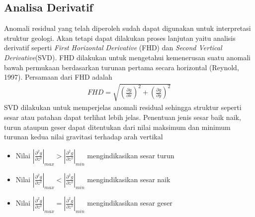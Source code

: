 \subsection{Analisa Derivatif}
\hspace{25pt} Anomali residual yang telah diperoleh sudah dapat digunakan untuk interpretasi struktur geologi. Akan tetapi dapat dilakukan proses lanjutan yaitu analisis derivatif seperti \textit{First Horizontal Derivative }(FHD) dan \textit{Second Vertical Derivative}(SVD). FHD dilakukan untuk mengetahui kemenerusan suatu anomali bawah permukaan berdasarkan turunan pertama secara horizontal (Reynold, 1997). Persamaan dari FHD adalah
\begin{align}
	FHD = \sqrt{\left ( \frac{\partial g}{\partial x} \right )^{2}+\left ( \frac{\partial g}{\partial y} \right )^{2}}
\end{align}
SVD dilakukan untuk memperjelas anomali residual sehingga struktur seperti sesar atau patahan dapat terlihat lebih jelas. Penentuan jenis sesar baik naik, turun ataupun geser dapat ditentukan dari nilai maksimum dan minimum turunan kedua nilai gravitasi terhadap arah vertikal \citep{Sarkowi}
\begin{itemize}
	\item Nilai $\left | \frac{\partial^2g}{\partial z^2} \right |_{max} > \left | \frac{\partial^2g}{\partial z^2} \right |_{min}$ mengindikasikan sesar turun 
	\item Nilai $\left | \frac{\partial^2g}{\partial z^2} \right |_{max} < \left | \frac{\partial^2g}{\partial z^2} \right |_{min}$ mengindikasikan sesar naik
	\item Nilai $\left | \frac{\partial^2g}{\partial z^2} \right |_{max} = \left | \frac{\partial^2g}{\partial z^2} \right |_{min}$ mengindikasikan sesar geser
\end{itemize}
